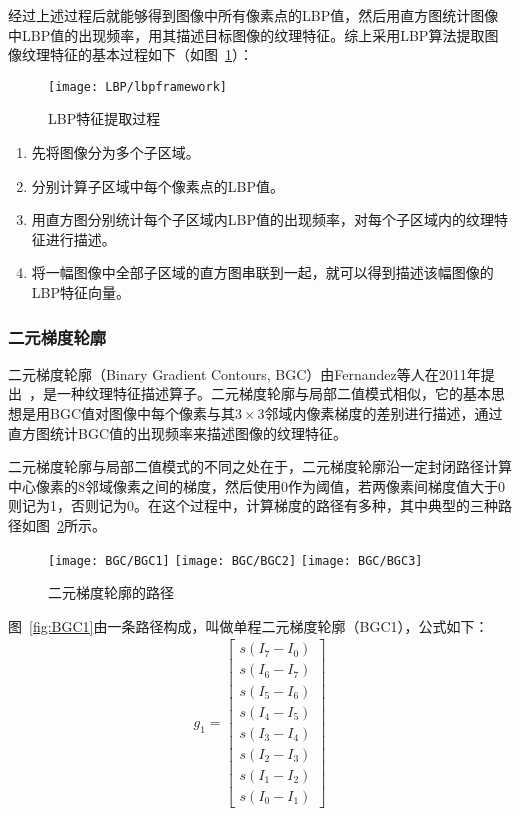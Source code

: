 经过上述过程后就能够得到图像中所有像素点的LBP值，然后用直方图统计图像中LBP值的出现频率，用其描述目标图像的纹理特征。综上采用LBP算法提取图像纹理特征的基本过程如下（如图~\ref{fig:lbpframework}）：
\begin{figure}[H] %
  \centering
  \texttt{[image: LBP/lbpframework]}
  \caption{LBP特征提取过程}
  \label{fig:lbpframework}
\end{figure}
\begin{enumerate}
\item 先将图像分为多个子区域。
\item 分别计算子区域中每个像素点的LBP值。
\item 用直方图分别统计每个子区域内LBP值的出现频率，对每个子区域内的纹理特征进行描述。
\item 将一幅图像中全部子区域的直方图串联到一起，就可以得到描述该幅图像的LBP特征向量。
\end{enumerate}

\subsubsection{二元梯度轮廓}

二元梯度轮廓（Binary Gradient Contours, BGC）由Fernandez等人在2011年提出~\cite{fernandez2011image}，是一种纹理特征描述算子。二元梯度轮廓与局部二值模式相似，它的基本思想是用BGC值对图像中每个像素与其$3 \times 3$邻域内像素梯度的差别进行描述，通过直方图统计BGC值的出现频率来描述图像的纹理特征。

二元梯度轮廓与局部二值模式的不同之处在于，二元梯度轮廓沿一定封闭路径计算中心像素的8邻域像素之间的梯度，然后使用0作为阈值，若两像素间梯度值大于0则记为1，否则记为0。在这个过程中，计算梯度的路径有多种，其中典型的三种路径如图~\ref{fig:BGCpath}所示。
\begin{figure}[h]
  \centering%
    {\texttt{[image: BGC/BGC1]}}%
  \hspace{4em}%
      {\texttt{[image: BGC/BGC2]}}
  \hspace{4em}%
      {\texttt{[image: BGC/BGC3]}}
  \caption{二元梯度轮廓的路径}
  \label{fig:BGCpath}
\end{figure}

图~\ref{fig:BGC1}由一条路径构成，叫做单程二元梯度轮廓（BGC1），公式如下：
\begin{eqnarray}
g_{1}=\left[ \begin{array}{l} s(I_{7}-I_{0}) \\ s(I_{6}-I_{7}) \\ s(I_{5}-I_{6}) \\ s(I_{4}-I_{5})\\ s(I_{3}-I_{4})\\ s(I_{2}-I_{3})\\ s(I_{1}-I_{2})\\ s(I_{0}-I_{1}) \end{array} \right]
\end{eqnarray}

